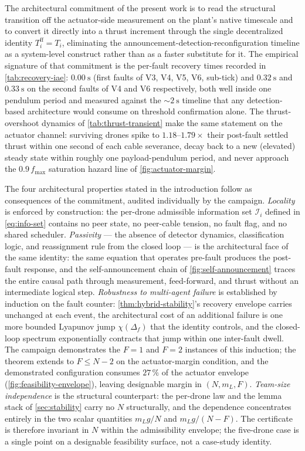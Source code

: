 The architectural commitment of the present work is to read the structural transition off the actuator-side measurement on the plant's native timescale and to convert it directly into a thrust increment through the single decentralized identity $T_i^{\mathrm{ff}}=T_i$, eliminating the announcement-detection-reconfiguration timeline as a system-level construct rather than as a faster substitute for it. The empirical signature of that commitment is the per-fault recovery times recorded in \cref{tab:recovery-iae}: $\SI{0.00}{\second}$ (first faults of V3, V4, V5, V6, sub-tick) and $\SI{0.32}{\second}$ and $\SI{0.33}{\second}$ on the second faults of V4 and V6 respectively, both well inside one pendulum period and measured against the $\sim\!\SI{2}{\second}$ timeline that any detection-based architecture would consume on threshold confirmation alone. The thrust-overshoot dynamics of \cref{tab:thrust-transient} make the same statement on the actuator channel: surviving drones spike to $1.18$--$1.79\!\times$ their post-fault settled thrust within one second of each cable severance, decay back to a new (elevated) steady state within roughly one payload-pendulum period, and never approach the $0.9\,f_{\max}$ saturation hazard line of \cref{fig:actuator-margin}.

The four architectural properties stated in the introduction follow as consequences of the commitment, audited individually by the campaign. \emph{Locality} is enforced by construction: the per-drone admissible information set $\mathcal{I}_i$ defined in \cref{eq:info-set} contains no peer state, no peer-cable tension, no fault flag, and no shared scheduler. \emph{Passivity} --- the absence of detector dynamics, classification logic, and reassignment rule from the closed loop --- is the architectural face of the same identity: the same equation that operates pre-fault produces the post-fault response, and the self-announcement chain of \cref{fig:self-announcement} traces the entire causal path through measurement, feed-forward, and thrust without an intermediate logical step. \emph{Robustness to multi-agent failure} is established by induction on the fault counter: \cref{thm:hybrid-stability}'s recovery envelope carries unchanged at each event, the architectural cost of an additional failure is one more bounded Lyapunov jump $\chi(\Delta_f)$ that the identity controls, and the closed-loop spectrum exponentially contracts that jump within one inter-fault dwell. The campaign demonstrates the $F=1$ and $F=2$ instances of this induction; the theorem extends to $F\le N-2$ on the actuator-margin condition, and the demonstrated configuration consumes $27\,\%$ of the actuator envelope (\cref{fig:feasibility-envelope}), leaving designable margin in $(N,m_L,F)$. \emph{Team-size independence} is the structural counterpart: the per-drone law and the lemma stack of \cref{sec:stability} carry no $N$ structurally, and the dependence concentrates entirely in the two scalar quantities $m_Lg/N$ and $m_Lg/(N{-}F)$. The certificate is therefore invariant in $N$ within the admissibility envelope; the five-drone case is a single point on a designable feasibility surface, not a case-study identity.

